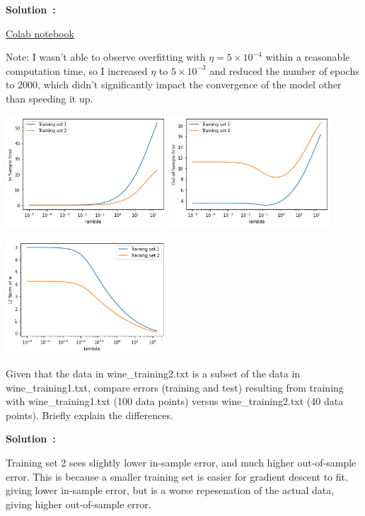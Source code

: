 \documentclass{article}
\newcounter{problem}[section]
\newenvironment{solution}[1][]
    {\par\medskip \begin{mdframed}\textbf{Solution~\Alph{problem}#1:} \begin{em}}
    {\end{em}\medskip\end{mdframed}\medskip}
\begin{document}
\begin{solution}
  \href{https://colab.research.google.com/drive/1RujLj2O-ulnnbdGWNEeWRFJ-sQnsWKtP?usp=sharing}{Colab notebook}

  Note: I wasn't able to observe overfitting with $\eta = 5 \times 10^{-4}$ within a reasonable computation time, so I increased $\eta$ to $5 \times 10^{-3}$ and reduced the number of epochs to 2000, which didn't significantly impact the convergence of the model other than speeding it up.
  
  \includegraphics[width=0.45\textwidth]{images/2c_ein.png}
  \includegraphics[width=0.45\textwidth]{images/2c_eout.png}

  \includegraphics[width=0.45\textwidth]{images/2c_norm.png}
\end{solution}

\problem[4]
Given that the data in wine\_training2.txt is a subset of the data in wine\_training1.txt, compare errors (training and test) resulting from training with wine\_training1.txt (100 data points) versus wine\_training2.txt (40 data points). Briefly explain the differences.

\begin{solution}
  Training set 2 sees slightly lower in-sample error, and much higher out-of-sample error.
  This is because a smaller training set is easier for gradient descent to fit, giving lower in-sample error, but is a worse repesenation of the actual data, giving higher out-of-sample error.
\end{solution}
\end{document}
